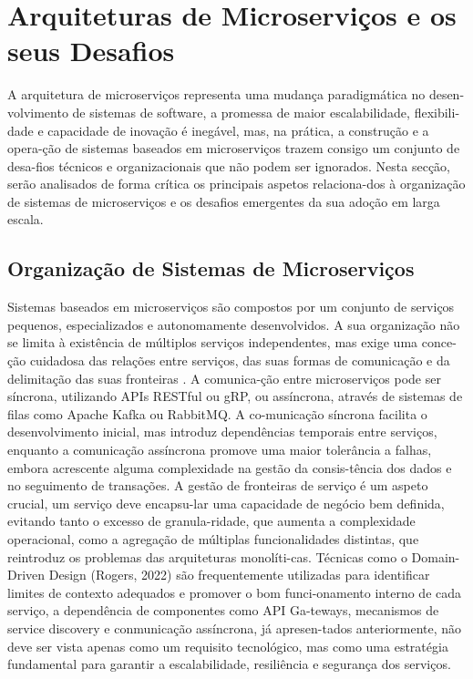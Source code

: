 \section{Arquiteturas de Microserviços e os seus Desafios}

A arquitetura de microserviços representa uma mudança paradigmática no desen-volvimento de sistemas de software, a promessa de maior escalabilidade, flexibili-dade e capacidade de inovação é inegável, mas, na prática, a construção e a opera-ção de sistemas baseados em microserviços trazem consigo um conjunto de desa-fios técnicos e organizacionais que não podem ser ignorados.
Nesta secção, serão analisados de forma crítica os principais aspetos relaciona-dos à organização de sistemas de microserviços e os desafios emergentes da sua adoção em larga escala.

\subsection{Organização de Sistemas de Microserviços}

Sistemas baseados em microserviços são compostos por um conjunto de serviços pequenos, especializados e autonomamente desenvolvidos. A sua organização não se limita à existência de múltiplos serviços independentes, mas exige uma conce-ção cuidadosa das relações entre serviços, das suas formas de comunicação e da delimitação das suas fronteiras \cite{Railic2021, Sambasivan2014}. A comunica-ção entre microserviços pode ser síncrona, utilizando APIs RESTful ou gRP, ou assíncrona, através de sistemas de filas como Apache Kafka ou RabbitMQ. A co-municação síncrona facilita o desenvolvimento inicial, mas introduz dependências temporais entre serviços, enquanto a comunicação assíncrona promove uma maior tolerância a falhas, embora acrescente alguma complexidade na gestão da consis-tência dos dados e no seguimento de transações.
A gestão de fronteiras de serviço é um aspeto crucial, um serviço deve encapsu-lar uma capacidade de negócio bem definida, evitando tanto o excesso de granula-ridade, que aumenta a complexidade operacional, como a agregação de múltiplas funcionalidades distintas, que reintroduz os problemas das arquiteturas monolíti-cas. 
Técnicas como o Domain-Driven Design (Rogers, 2022) são frequentemente utilizadas para identificar limites de contexto adequados e promover o bom funci-onamento interno de cada serviço, a dependência de componentes como API Ga-teways, mecanismos de service discovery e conmunicação assíncrona, já apresen-tados anteriormente, não deve ser vista apenas como um requisito tecnológico, mas como uma estratégia fundamental para garantir a escalabilidade, resiliência e segurança dos serviços.

